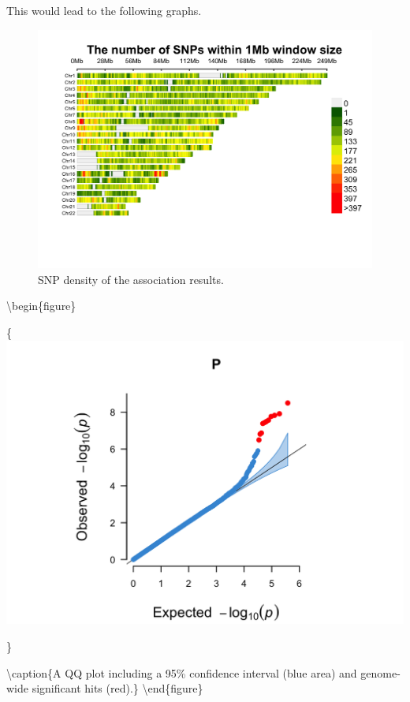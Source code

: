 \documentclass[
]{book}
\begin{document}
This would lead to the following graphs.

\begin{figure}

{\centering \includegraphics[width=18.67in]{img/_gwas/WTCCC1ResultsManhattan-density} 

}

\caption{SNP density of the association results.}\label{fig:show-wtccc1-graphs-density}
\end{figure}

\textbackslash begin\{figure\}

\{\centering \includegraphics[width=18.67in]{img/_gwas/WTCCC1ResultsManhattan-qq}

\}

\textbackslash caption\{A QQ plot including a 95\% confidence interval (blue area) and genome-wide significant hits (red).\}\label{fig:show-wtccc1-graphs-qq}
\textbackslash end\{figure\}
\end{document}
